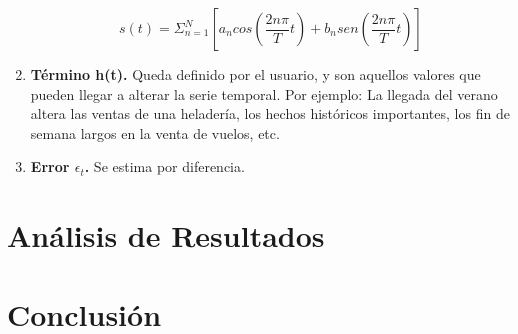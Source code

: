 \documentclass[a4paper,10pt]{article}
\begin{document}
\begin{enumerate}
 \begin{equation}
  s(t) = \Sigma_{n=1}^N [a_n cos(\frac{2n\pi}{T}t) + b_n sen (\frac{2n\pi}{T}t) ]
 \end{equation}


 \item \textbf{Término h(t).} Queda definido por el usuario, y son aquellos valores que pueden llegar a alterar la serie temporal. Por ejemplo: La llegada del verano altera las ventas de una heladería, los hechos históricos importantes, los fin de semana largos en la venta de vuelos, etc.

 \item \textbf{Error $\epsilon_t$.} Se estima por diferencia.

\end{enumerate}

\section{Análisis de Resultados}

\section{Conclusión}
\end{document}
